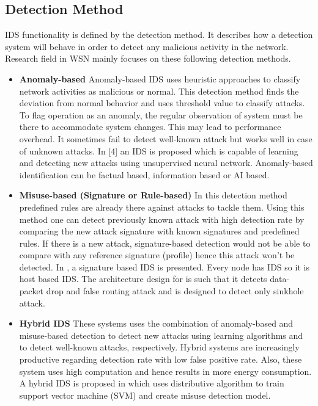 \subsection{Detection Method}
IDS functionality is defined by the detection method. It describes how a detection system will behave in order to detect any malicious activity in the network. Research field in WSN mainly focuses on these following detection methods.
\begin{itemize}
  \item{\textbf{Anomaly-based} Anomaly-based IDS uses heuristic approaches to classify network activities as malicious or normal. This detection method finds the deviation from normal behavior and uses threshold value to classify attacks. To flag operation as an anomaly, the regular observation of system must be there to accommodate system changes. This may lead to performance overhead. It sometimes fail to detect well-known attack but works well in case of unknown attacks. In [4] an IDS is proposed which is capable of learning and detecting new attacks using unsupervised neural network. Anomaly-based identification can be factual based, information based or AI based.}
  \item{\textbf{Misuse-based (Signature or Rule-based)} In this detection method predefined rules are already there against attacks to tackle them. Using this method one can detect previously known attack with high detection rate by comparing the new attack signature with known signatures and predefined rules. If there is a new attack, signature-based detection would not be able to compare with any reference signature (profile) hence this attack won’t be detected. In \cite{ioannis2007towards, krontiris2007intrusion}, a signature based IDS is presented. Every node has IDS so it is host based IDS. The architecture design for \cite{ioannis2007towards} is such that it detects data-packet drop and false routing attack and \cite{krontiris2007intrusion} is designed to detect only sinkhole attack.}
  \item{\textbf{Hybrid IDS} These systems uses the combination of anomaly-based and misuse-based detection to detect new attacks using learning algorithms and  to detect well-known attacks, respectively. Hybrid systems are increasingly productive regarding detection rate with low false positive rate. Also, these system uses high computation and hence results in more energy consumption. A hybrid IDS is proposed in \cite{li2008intruder} which uses distributive algorithm to train support vector machine (SVM) and create misuse detection model.}
\end{itemize}

